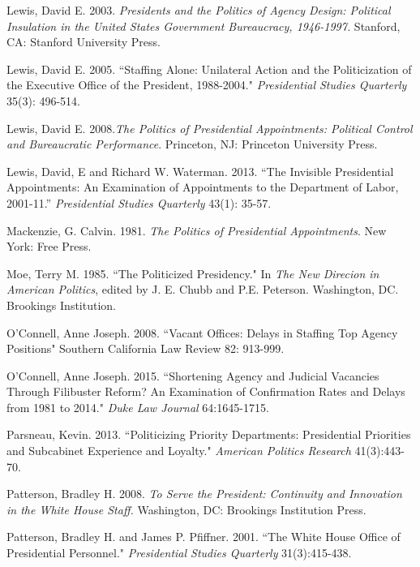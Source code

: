 \documentclass[12pt]{article}
\begin{document}
\noindent \hangindent=0.7cm Lewis, David E. 2003. \textit{Presidents and the Politics of Agency Design: Political Insulation in the United States Government Bureaucracy, 1946-1997.} Stanford, CA: Stanford University Press.

\noindent \hangindent=0.7cm Lewis, David E. 2005. ``Staffing Alone: Unilateral Action and the Politicization of the Executive Office of the President, 1988-2004." \textit{Presidential Studies Quarterly} 35(3): 496-514.

\noindent \hangindent=0.7cm Lewis, David E. 2008.\textit{The Politics of Presidential Appointments: Political Control and Bureaucratic Performance}. Princeton, NJ: Princeton University Press. 

\noindent \hangindent=0.7cm Lewis, David, E and Richard W. Waterman. 2013. ``The Invisible Presidential Appointments: An Examination of Appointments to the Department of Labor, 2001-11.'' \textit{Presidential Studies Quarterly} 43(1): 35-57.

\noindent \hangindent=0.7cm Mackenzie, G. Calvin. 1981. \textit{The Politics of Presidential Appointments}. New York: Free Press. 

\noindent \hangindent=0.7cm  Moe, Terry M. 1985. ``The Politicized Presidency." In \textit{The New Direcion in American Politics}, edited by J. E. Chubb and P.E. Peterson. Washington, DC. Brookings Institution. 

\noindent \hangindent=0.7cm O'Connell, Anne Joseph. 2008. ``Vacant Offices: Delays in Staffing Top Agency Positions" Southern California Law Review 82: 913-999.

\noindent \hangindent=0.7cm O'Connell, Anne Joseph. 2015. ``Shortening Agency and Judicial Vacancies Through Filibuster Reform? An Examination of Confirmation Rates and Delays from 1981 to 2014." \textit{Duke Law Journal} 64:1645-1715.

\noindent \hangindent=0.7cm Parsneau, Kevin. 2013. ``Politicizing Priority Departments: Presidential Priorities and Subcabinet Experience and Loyalty." \textit{American Politics Research} 41(3):443-70.

\noindent \hangindent=0.7cm Patterson, Bradley H. 2008. \textit{To Serve the President: Continuity and Innovation in the White House Staff.} Washington, DC: Brookings Institution Press.

\noindent \hangindent=0.7cm Patterson, Bradley H. and James P. Pfiffner. 2001. ``The White House Office of Presidential Personnel." \textit{Presidential Studies Quarterly} 31(3):415-438.
\end{document}
